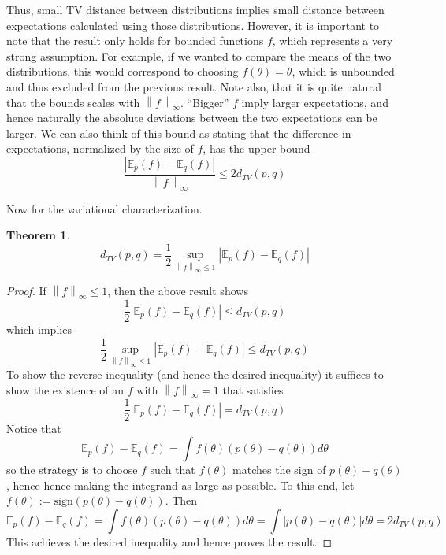 \documentclass[12pt]{article}
\newcommand*{\norm}[1]{\left\lVert#1\right\rVert}
\newcommand*{\abs}[1]{\left\lvert#1\right\rvert}
\newcommand{\E}{\mathbb{E}}
\newtheorem{thm}{Theorem}
\begin{document}
Thus, small TV distance between distributions implies small distance between expectations calculated using those distributions. 
However, it is important to note that the result only holds for bounded functions $f$, which represents a very strong assumption. For example, if we wanted to compare 
the means of the two distributions, this would correspond to choosing $f(\theta) = \theta$, which is unbounded and thus excluded from the previous result. Note also, that it 
is quite natural that the bounds scales with $\norm{f}_{\infty}$. ``Bigger'' $f$ imply larger expectations, and hence naturally the absolute deviations between the two expectations can 
be larger. We can also think of this bound as stating that the difference in expectations, normalized by the size of $f$, has the upper bound
\[\frac{\abs{\E_p(f) - \E_q(f)} }{\norm{f}_\infty} \leq 2d_{TV}(p, q)\]

\noindent
Now for the variational characterization. 
\begin{thm} 
\[d_{TV}(p, q) = \frac{1}{2} \sup_{\norm{f}_\infty \leq 1} \abs{\E_p(f) - \E_q(f)}\]
\end{thm}

\begin{proof}
If $\norm{f}_\infty \leq 1$, then the above result shows
\[\frac{1}{2} \abs{\E_p(f) - \E_q(f)} \leq d_{TV}(p, q)\]
which implies 
\[\frac{1}{2} \sup_{\norm{f}_\infty \leq 1} \abs{\E_p(f) - \E_q(f)} \leq d_{TV}(p, q)\]
To show the reverse inequality (and hence the desired inequality) it suffices to show the existence of an $f$ with $\norm{f}_\infty = 1$ that satisfies 
\[\frac{1}{2} \abs{\E_p(f) - \E_q(f)} = d_{TV}(p, q)\]
Notice that 
\[\E_p(f) - \E_q(f) = \int f(\theta)\left(p(\theta) - q(\theta) \right) d\theta\]
so the strategy is to choose $f$ such that $f(\theta)$ matches the sign of $p(\theta) - q(\theta)$, hence hence making the integrand as large as possible. 
To this end, let $f(\theta) := \text{sign}\left(p(\theta) - q(\theta)\right)$. Then 
\[\E_p(f) - \E_q(f) = \int f(\theta)\left(p(\theta) - q(\theta) \right) d\theta = \int \abs{p(\theta) - q(\theta)} d\theta = 2d_{TV}(p, q)\]
This achieves the desired inequality and hence proves the result. 
\end{proof}
\end{document}
